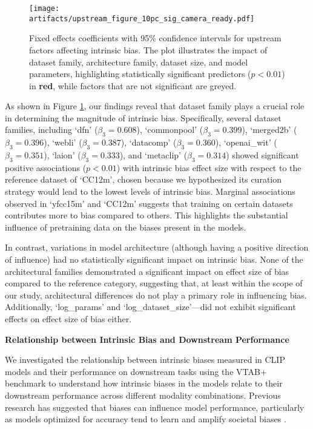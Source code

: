 \begin{figure}[h]
    \centering
    \texttt{[image: artifacts/upstream\_figure\_10pc\_sig\_camera\_ready.pdf]}
    \caption{Fixed effects coefficients with 95\% confidence intervals for upstream factors affecting intrinsic bias. The plot illustrates the impact of dataset family, architecture family, dataset size, and model parameters, highlighting statistically significant predictors ($p < 0.01$) in \textbf{red}, while factors that are not significant are greyed.}
    \label{fig:rq2}
\end{figure}
%

As shown in Figure \ref{fig:rq2}, our findings reveal that dataset family plays a crucial role in determining the magnitude of intrinsic bias. Specifically, several dataset families, including `dfn' ($\beta_{3}=0.608$), `commonpool' ($\beta_{3}=0.399$), `merged2b' ($\beta_{3}=0.396$), `webli' ($\beta_{3}=0.387$), `datacomp' ($\beta_{3}=0.360$), `openai\_wit' ($\beta_{3}=0.351$), `laion' ($\beta_{3}=0.333$), and `metaclip' ($\beta_{3}=0.314$) showed significant positive associations ($p<0.01$) with intrinsic bias effect size with respect to the reference dataset of `CC12m', chosen because we hypothesized its curation strategy would lead to the lowest levels of intrinsic bias. Marginal associations observed in `yfcc15m' and `CC12m' suggests that training on certain datasets contributes more to bias compared to others. This highlights the substantial influence of pretraining data on the biases present in the models.

In contrast, variations in model architecture (although having a positive direction of influence) had no statistically significant impact on intrinsic bias. None of the architectural families demonstrated a significant impact on effect size of bias compared to the reference category, suggesting that, at least within the scope of our study, architectural differences do not play a primary role in influencing bias. Additionally, `log\_params' and `log\_dataset\_size'—did not exhibit significant effects on effect size of bias either. 



\noindent\textbf{Relationship between Intrinsic Bias and Downstream Performance}

We investigated the relationship between intrinsic biases measured in CLIP models and their performance on downstream tasks using the VTAB+ benchmark \cite{Schuhmann2022LAION-5B:Models} to understand how intrinsic biases in the models relate to their downstream performance across different modality combinations. Previous research has suggested that biases can influence model performance, particularly as models optimized for accuracy tend to learn and amplify societal biases \cite{hall2022systematic}.

